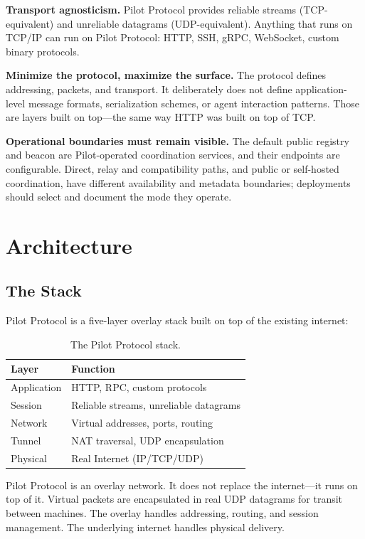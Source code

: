 \documentclass[11pt,a4paper]{article}
\begin{document}
\textbf{Transport agnosticism.} Pilot Protocol provides reliable streams (TCP-equivalent) and unreliable datagrams (UDP-equivalent). Anything that runs on TCP/IP can run on Pilot Protocol: HTTP, SSH, gRPC, WebSocket, custom binary protocols.

\textbf{Minimize the protocol, maximize the surface.} The protocol defines addressing, packets, and transport. It deliberately does not define application-level message formats, serialization schemes, or agent interaction patterns. Those are layers built on top---the same way HTTP was built on top of TCP.

\textbf{Operational boundaries must remain visible.} The default public registry and beacon are Pilot-operated coordination services, and their endpoints are configurable. Direct, relay and compatibility paths, and public or self-hosted coordination, have different availability and metadata boundaries; deployments should select and document the mode they operate.

\section{Architecture}

\subsection{The Stack}

Pilot Protocol is a five-layer overlay stack built on top of the existing internet:

\begin{table}[h]
\centering
\begin{tabular}{@{}ll@{}}
\toprule
\textbf{Layer} & \textbf{Function} \\
\midrule
Application     & HTTP, RPC, custom protocols \\
Session         & Reliable streams, unreliable datagrams \\
Network         & Virtual addresses, ports, routing \\
Tunnel          & NAT traversal, UDP encapsulation \\
Physical        & Real Internet (IP/TCP/UDP) \\
\bottomrule
\end{tabular}
\caption{The Pilot Protocol stack.}
\label{tab:stack}
\end{table}

Pilot Protocol is an overlay network. It does not replace the internet---it runs on top of it. Virtual packets are encapsulated in real UDP datagrams for transit between machines. The overlay handles addressing, routing, and session management. The underlying internet handles physical delivery.
\end{document}
